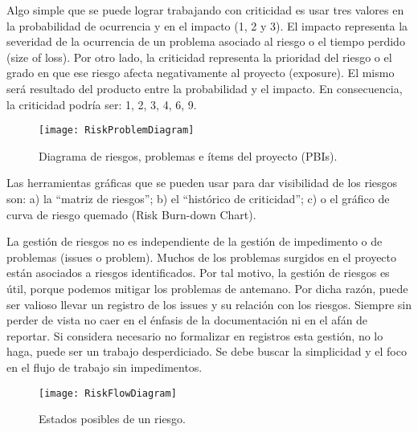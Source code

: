 Algo simple que se puede lograr trabajando con criticidad es usar tres valores en la probabilidad de ocurrencia y en el impacto (1, 2 y 3). El impacto representa la severidad de la ocurrencia de un problema asociado al riesgo o el tiempo perdido (size of loss). Por otro lado, la criticidad representa la prioridad del riesgo o el grado en que ese riesgo afecta negativamente al proyecto (exposure). El mismo será resultado del producto entre la probabilidad y el impacto. En consecuencia, la criticidad podría ser: 1, 2, 3, 4, 6, 9.

\begin{figure}[h]
  \centering
  \texttt{[image: RiskProblemDiagram]}
  \caption{Diagrama de riesgos, problemas e ítems del proyecto (PBIs).}
  \centering
  \label{fig:RiskProblemDiagram} %
\end{figure}

Las herramientas gráficas que se pueden usar para dar visibilidad de los riesgos son: a) la “matriz de riesgos”; b) el “histórico de criticidad”; c) o el gráfico de curva de riesgo quemado (Risk Burn-down Chart).

La gestión de riesgos no es independiente de la gestión de impedimento o de problemas (issues o problem). Muchos de los problemas surgidos en el proyecto están asociados a riesgos identificados. Por tal motivo, la gestión de riesgos es útil, porque podemos mitigar los problemas de antemano. Por dicha razón, puede ser valioso llevar un registro de los issues y su relación con los riesgos. Siempre sin perder de vista no caer en el énfasis de la documentación ni en el afán de reportar. Si considera necesario no formalizar en registros esta gestión, no lo haga, puede ser un trabajo desperdiciado. Se debe buscar la simplicidad y el foco en el flujo de trabajo sin impedimentos.

\begin{figure}[h]
  \centering
  \texttt{[image: RiskFlowDiagram]}
  \caption{Estados posibles de un riesgo.}
  \centering
  \label{fig:RiskFlowDiagram} %
\end{figure}
